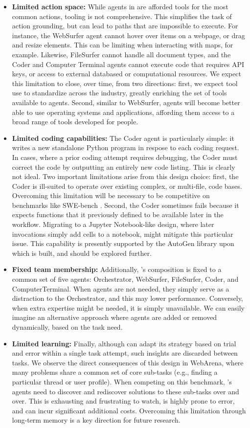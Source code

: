 \begin{itemize}
    \item \textbf{Limited action space:} While agents in \team{} are afforded tools for the most common actions, tooling is not comprehensive. This simplifies the task of action grounding, but can lead to paths that are impossible to execute. For instance, the WebSurfer agent cannot hover over items on a webpage, or drag and resize elements. This can be limiting when interacting with maps, for example. Likewise, FileSurfer cannot handle all document types, and the Coder and Computer Terminal agents cannot execute code that requires API keys, or access to external databased or computational resources. We expect this limitation to close, over time, from two directions: first, we expect tool use to standardize across the industry, greatly enriching the set of tools available to agents. Second, similar to WebSurfer, agents will become better able to use operating systems and applications, affording them access to a broad range of tools developed for people.
    \item \textbf{Limited coding capabilities:} The \team{} Coder agent is particularly simple: it writes a new standalone Python program in respose to each coding request. In cases, where a prior coding attempt requires debugging, the Coder must correct the code by outputting an entirely new code listing. This is clearly not ideal. Two important limitations arise from this design choice: first, the Coder is ill-suited to operate over existing complex, or multi-file, code bases. Overcoming this limitation will be necessary to be competitive on benchmarks like SWE-bench \cite{jimenez2024swebenchlanguagemodelsresolve}. Second, the Coder sometimes fails because it expects functions that it previously defined to be available later in the workflow. Migrating to a Jupyter Notebook-like design, where later invocations simply add cells to a notebook, might mitigate this particular issue. This capability is presently supported by the AutoGen library upon which \team is built, and should be explored further.
    \item \textbf{Fixed team membership:} Additionally, \team's composition is fixed to a common set of five agents: Orchestrator, WebSurfer, FileSurfer, Coder, and ComputerTerminal. When agents are not needed, they simply serve as a distraction to the Orchestrator, and this may lower performance. Conversely, when extra expertise might be needed, it is simply unavailable. We can easily imagine an alternative approach where agents are added or removed dynamically, based on the task need. 
    \item \textbf{Limited learning:} Finally, although \team can adapt its strategy based on trial and error within a single task attempt, such insights are discarded between tasks. We observe the direct consequences of this design in WebArena, where many problems share a common set of core sub-tasks (e.g., finding a particular thread or user profile). When competing on this benchmark, \team's agents need to discover and rediscover solutions to these sub-tasks over and over. This is exhausting and frustrating to watch, is highly prone to error, and can incur significant additional costs. Overcoming this limitation through long-term memory is a key direction for future research.

\end{itemize}
